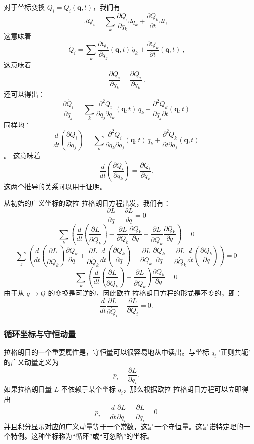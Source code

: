 对于坐标变换 
\({\displaystyle Q_{i}=Q_{i}(\mathbf {q} ,t)}\)，我们有
\[{\displaystyle d{Q_{i}}=\sum _{k}{\frac {\partial Q_{i}}{\partial q_{k}}}d{q_{k}}+{\frac {\partial Q_{k}}{\partial t}}dt,}~\]
这意味着 
\[{\displaystyle {\dot {Q_{i}}}=\sum _{k}{\frac {\partial Q_{i}}{\partial q_{k}}}(\mathbf {q} ,t)\,{\dot {q}}_{k}+{\frac {\partial Q_{k}}{\partial t}}(\mathbf {q} ,t)}~,\]
这意味着
\[{\displaystyle {\frac {\partial {\dot {Q_{i}}}}{\partial {\dot {q}}_{k}}}={\frac {\partial Q_{i}}{\partial q_{k}}}}~.\]
还可以得出：
\[{\displaystyle {\frac {\partial {\dot {Q_{i}}}}{\partial q_{j}}}=\sum _{k}{\frac {\partial ^{2}Q_{i}}{\partial q_{j}\partial q_{k}}}(\mathbf {q} ,t)\,{\dot {q}}_{k}+{\frac {\partial ^{2}Q_{k}}{\partial q_{j}\partial t}}(\mathbf {q} ,t)}~\]
同样地：
\[{\displaystyle {\frac {d}{dt}}\left({\frac {\partial {Q_{i}}}{\partial q_{j}}}\right)=\sum _{k}{\frac {\partial ^{2}Q_{i}}{\partial q_{k}\partial q_{j}}}(\mathbf {q} ,t)\,{\dot {q}}_{k}+{\frac {\partial ^{2}Q_{k}}{\partial t\partial q_{j}}}(\mathbf {q} ,t)}~\]。 
这意味着  
\[
\frac{d}{dt}\left(\frac{\partial Q_{i}}{\partial q_{k}}\right)=\frac{\partial \dot{Q}_{i}}{\partial q_{k}}.~
\]
这两个推导的关系可以用于证明。

从初始的广义坐标的欧拉-拉格朗日方程出发，我们有：
\[
\frac{\partial L}{\partial \dot{q}} - \frac{\partial L}{\partial q} = 0~
\]
\[
\sum_{k}\left(\frac{d}{dt}\left(\frac{\partial L}{\partial \dot{Q}_{k}}\right) - \frac{\partial L}{\partial Q_{k}} \frac{\partial Q_{k}}{\partial q} - \frac{\partial L}{\partial \dot{Q}_{k}} \frac{\partial \dot{Q}_{k}}{\partial q}\right) = 0~
\]
\[
\sum_{k}\left(\frac{d}{dt}\left(\frac{\partial L}{\partial \dot{Q}_{k}}\right)\frac{\partial \dot{Q}_{k}}{\partial \dot{q}} + \frac{\partial L}{\partial \dot{Q}_{k}} \frac{d}{dt}\left(\frac{\partial \dot{Q}_{k}}{\partial \dot{q}}\right) - \frac{\partial L}{\partial Q_{k}} \frac{\partial \dot{Q}_{k}}{\partial \dot{q}} - \frac{\partial L}{\partial \dot{Q}_{k}} \frac{d}{dt}\left(\frac{\partial Q_{k}}{\partial q}\right)\right) = 0~
\]
\[
\sum_{k}\left(\frac{d}{dt}\left(\frac{\partial L}{\partial \dot{Q}_{k}}\right) - \frac{\partial L}{\partial \dot{Q}_{k}}\right) \frac{\partial Q_{k}}{\partial q} = 0~
\]
由于从 \( q \rightarrow Q \) 的变换是可逆的，因此欧拉-拉格朗日方程的形式是不变的，即：
\[
\frac{d}{dt}\frac{\partial L}{\partial \dot{Q}_{i}} - \frac{\partial L}{\partial Q_{i}} = 0.~
\]
\subsubsection{循环坐标与守恒动量}
拉格朗日的一个重要属性是，守恒量可以很容易地从中读出。与坐标 \( q_i \) '正则共轭' 的广义动量定义为
\[
p_{i} = \frac{\partial L}{\partial \dot{q}_{i}}.~
\]
如果拉格朗日量 \( L \) 不依赖于某个坐标 \( q_i \)，那么根据欧拉-拉格朗日方程可以立即得出
\[
\dot{p}_{i} = \frac{d}{dt} \frac{\partial L}{\partial \dot{q}_{i}} = \frac{\partial L}{\partial q_{i}} = 0~
\]
并且积分显示对应的广义动量等于一个常数，这是一个守恒量。这是诺特定理的一个特例。这种坐标称为“循环”或“可忽略”的坐标。


